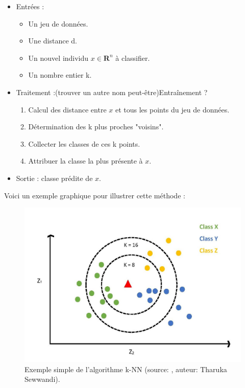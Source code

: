 \documentclass[11pt]{article}
\begin{document}
    \begin{itemize}
        \item Entrées :
            \begin{itemize}
                \item Un jeu de données.
                \item Une distance d.
                \item Un nouvel individu $x \in \mathbf{R}^{n}$ à classifier.
                \item Un nombre entier k.
            \end{itemize}
            
        \item Traitement :(trouver un autre nom peut-être)Entraînement ?
            \begin{enumerate}
                \item Calcul des distance entre $x$ et tous les points du jeu de données.
                \item Détermination des k plus proches "voisins".
                \item Collecter les classes de ces k points.
                \item Attribuer la classe la plus présente à $x$.
            \end{enumerate}
        
        \item Sortie : classe prédite de $x$.
    \end{itemize}

Voici un exemple graphique pour illustrer cette méthode :

\begin{figure}[hbt!]
    \centering
    \includegraphics[width = 15 cm]{./figures/knn_example.jpeg}
    \caption{Exemple simple de l'algorithme k-NN (source: \cite{5}, auteur: Tharuka Sewwandi).}
    \label{12}
\end{figure}
\FloatBarrier
\end{document}
